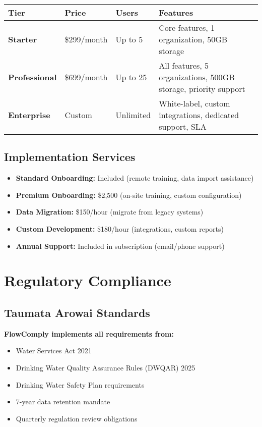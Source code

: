 \documentclass[11pt,a4paper]{article}
\begin{document}
\begin{table}[H]
\centering
\begin{tabular}{p{3cm}p{2.5cm}p{3cm}p{5cm}}
\toprule
\textbf{Tier} & \textbf{Price} & \textbf{Users} & \textbf{Features} \\
\midrule
\textbf{Starter} & \$299/month & Up to 5 & Core features, 1 organization, 50GB storage \\[0.5cm]
\textbf{Professional} & \$699/month & Up to 25 & All features, 5 organizations, 500GB storage, priority support \\[0.5cm]
\textbf{Enterprise} & Custom & Unlimited & White-label, custom integrations, dedicated support, SLA \\
\bottomrule
\end{tabular}
\end{table}

\subsection{Implementation Services}

\begin{itemize}[leftmargin=*, itemsep=0.3em]
    \item \textbf{Standard Onboarding:} Included (remote training, data import assistance)
    \item \textbf{Premium Onboarding:} \$2,500 (on-site training, custom configuration)
    \item \textbf{Data Migration:} \$150/hour (migrate from legacy systems)
    \item \textbf{Custom Development:} \$180/hour (integrations, custom reports)
    \item \textbf{Annual Support:} Included in subscription (email/phone support)
\end{itemize}

\newpage

\section{Regulatory Compliance}

\subsection{Taumata Arowai Standards}

\begin{highlightbox}
    \textbf{FlowComply implements all requirements from:}
    \begin{itemize}[itemsep=0.2em]
        \item Water Services Act 2021
        \item Drinking Water Quality Assurance Rules (DWQAR) 2025
        \item Drinking Water Safety Plan requirements
        \item 7-year data retention mandate
        \item Quarterly regulation review obligations
    \end{itemize}
\end{highlightbox}
\end{document}
